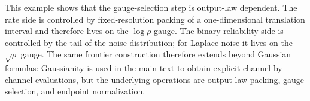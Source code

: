 \documentclass[lettersize,onecolumn]{IEEEtran}
\newcommand{\snr}{\rho}
\begin{document}
This example shows that the gauge-selection step is output-law dependent. The rate side is controlled by fixed-resolution packing of a one-dimensional translation interval and therefore lives on the $\log\snr$ gauge. The binary reliability side is controlled by the tail of the noise distribution; for Laplace noise it lives on the $\sqrt{\snr}$ gauge. The same frontier construction therefore extends beyond Gaussian formulas: Gaussianity is used in the main text to obtain explicit channel-by-channel evaluations, but the underlying operations are output-law packing, gauge selection, and endpoint normalization.



\end{document}
